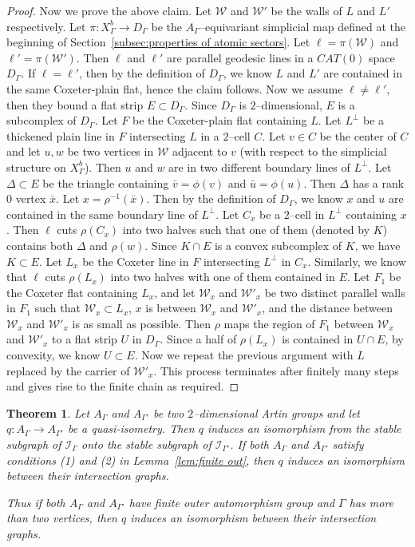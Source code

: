 \documentclass[11pt]{amsart}
\newcommand {\I}{\mathcal I}
\newcommand {\W}{\mathcal W}
\newtheorem{theorem}{Theorem}[section]
\theoremstyle{definition}
\begin{document}
\begin{proof}
	Now we prove the above claim. Let $\W$ and $\W'$ be the walls of $L$ and $L'$ respectively. Let $\pi \colon X^b_\Gamma\to D_\Gamma$ be the $A_\Gamma$--equivariant simplicial map defined at the beginning of Section~\ref{subsec:properties of atomic sectors}. Let $\ell=\pi(\W)$ and $\ell'=\pi(\W')$. Then $\ell$ and $\ell'$ are parallel geodesic lines in a $CAT(0)$ space $D_\Gamma$. If $\ell=\ell'$, then by the definition of $D_\Gamma$, we know $L$ and $L'$ are contained in the same Coxeter-plain flat, hence the claim follows. Now we assume $\ell\neq\ell'$, then they bound a flat strip $E\subset D_\Gamma$. Since $D_\Gamma$ is $2$--dimensional, $E$ is a subcomplex of $D_\Gamma$. Let $F$ be the Coxeter-plain flat containing $L$. Let $L^\perp$ be a thickened plain line in $F$ intersecting $L$ in a $2$--cell $C$. Let $v\in C$ be the center of $C$ and let $u,w$ be two vertices in $\W$ adjacent to $v$ (with respect to the simplicial structure on $X^b_\Gamma$). Then $u$ and $w$ are in two different boundary lines of $L^\perp$. Let $\Delta\subset E$ be the triangle containing $\bar{v}=\phi(v)$ and $\bar{u}=\phi(u)$. Then $\Delta$ has a rank 0 vertex $\bar{x}$. Let $x=\rho^{-1}(\bar x)$. Then by the definition of $D_\Gamma$, we know $x$ and $u$ are contained in the same boundary line of $L^\perp$. Let $C_x$ be a $2$--cell in $L^\perp$ containing $x$. Then $\ell$ cuts $\rho(C_x)$ into two halves such that one of them (denoted by $K$) contains both $\Delta$ and $\rho(w)$. Since $K\cap E$ is a convex subcomplex of $K$, we have $K\subset E$. Let $L_x$ be the Coxeter line in $F$ intersecting $L^\perp$ in $C_x$. Similarly, we know that $\ell$ cuts $\rho(L_x)$ into two halves with one of them contained in $E$. Let $F_1$ be the Coxeter flat containing $L_x$, and let $\W_x$ and $\W'_x$ be two distinct parallel walls in $F_1$ such that $\W_x\subset L_x$, $x$ is between $\W_x$ and $\W'_x$, and the distance between $\W_x$ and $\W'_x$ is as small as possible. Then $\rho$ maps the region of $F_1$ between $\W_x$ and $\W'_x$ to a flat strip $U$ in $D_\Gamma$. Since a half of $\rho(L_x)$ is contained in $U\cap E$, by convexity, we know  $U\subset E$. Now we repeat the previous argument with $L$ replaced by the carrier of $\W'_x$. This process terminates after finitely many steps and gives rise to the finite chain as required.
\end{proof}

\begin{theorem}
	\label{thm:invariance}
	Let $A_{\Gamma}$ and $A_{\Gamma'}$ be two $2$--dimensional Artin groups and let $q\colon A_\Gamma\to A_{\Gamma'}$ be a quasi-isometry. Then $q$ induces an isomorphism from the stable subgraph of $\I_{\Gamma}$ onto the stable subgraph of $\I_{\Gamma'}$. 
If both $A_\Gamma$ and $A_{\Gamma'}$ satisfy conditions (1) and (2) in Lemma~\ref{lem:finite out}, then $q$ induces an isomorphism between their intersection graphs. 

Thus if both $A_\Gamma$ and $A_{\Gamma'}$ have finite outer automorphism group and $\Gamma$ has more than two vertices, then $q$ induces an isomorphism between their intersection graphs.
\end{theorem}
\end{document}
